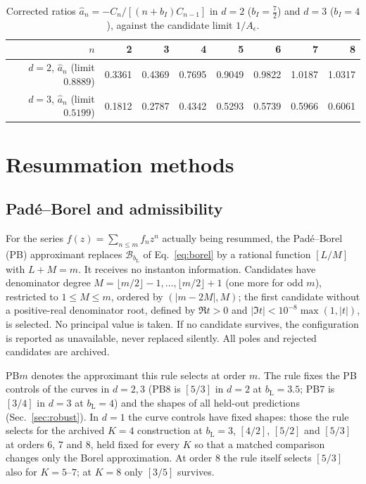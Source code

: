 \documentclass[11pt,a4paper]{article}
\numberwithin{equation}{section}
\newcommand{\Ae}{A_\epsilon}
\newcommand{\bL}{b_{\mathrm L}}
\newcommand{\cB}{\mathcal B}
\begin{document}
\begin{table}[htbp]\centering\small
\begin{tabular}{@{}r r r r r r r r@{}}
\toprule
$n$ & 2 & 3 & 4 & 5 & 6 & 7 & 8\\ \midrule
$d=2$, $\widehat a_n$ (limit $0.8889$) & 0.3361 & 0.4369 & 0.7695 & 0.9049 & 0.9822 & 1.0187 & 1.0317\\
$d=3$, $\widehat a_n$ (limit $0.5199$) & 0.1812 & 0.2787 & 0.4342 & 0.5293 & 0.5739 & 0.5966 & 0.6061\\
\bottomrule
\end{tabular}
\caption{Corrected ratios $\widehat a_n=-C_n/[(n+b_I)C_{n-1}]$ in $d=2$ ($b_I=\frac72$) and
$d=3$ ($b_I=4$), against the candidate limit $1/\Ae$.}
\label{tab:ratios23}
\end{table}

\section{Resummation methods}\label{sec:methods}
\subsection{Pad\'e--Borel and admissibility}\label{sec:pade}
For the series $f(z)=\sum_{n\le m}f_nz^n$ actually being resummed, the Pad\'e--Borel (PB)
approximant replaces $\cB_{\bL}$ of Eq.~\eqref{eq:borel} by a rational function $[L/M]$
with $L+M=m$. It receives no instanton information. Candidates have denominator degree
$M=\lfloor m/2\rfloor-1,\dots,\lfloor m/2\rfloor+1$ (one more for odd $m$), restricted to
$1\le M\le m$, ordered by $(|m-2M|,M)$; the first candidate without a positive-real
denominator root, defined by $\Re t>0$ and $|\Im t|<10^{-8}\max(1,|t|)$, is selected. No
principal value is taken. If no candidate survives, the configuration is reported as
unavailable, never replaced silently. All poles and rejected candidates are archived.

PB$m$ denotes the approximant this rule selects at order $m$. The rule fixes the PB controls
of the curves in $d=2,3$ (PB8 is $[5/3]$ in $d=2$ at $\bL=3.5$; PB7 is $[3/4]$ in $d=3$ at
$\bL=4$) and the shapes of all held-out predictions (Sec.~\ref{sec:robust}). In $d=1$ the
curve controls have fixed shapes: those the rule selects for the archived $K=4$ construction
at $\bL=3$, $[4/2]$, $[5/2]$ and $[5/3]$ at orders 6, 7 and 8, held fixed for every $K$ so
that a matched comparison changes only the Borel approximation. At order 8 the rule itself
selects $[5/3]$ also for $K=5$--$7$; at $K=8$ only $[3/5]$ survives.
\end{document}
